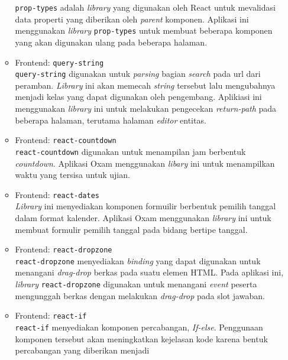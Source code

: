 \begin{itemize}
\begin{itemize}
                    \texttt{prop-types} adalah \textit{library} yang digunakan oleh React untuk mevalidasi data 
                    properti yang diberikan oleh \textit{parent} komponen. Aplikasi ini menggunakan \textit{library}
                    \texttt{prop-types} untuk membuat beberapa komponen yang akan digunakan ulang pada beberapa
                    halaman.
                \item Frontend: \texttt{query-string} \\
                    \texttt{query-string} digunakan untuk \textit{parsing} bagian \textit{search} pada url dari
                    peramban. \textit{Library} ini akan memecah \textit{string} tersebut lalu mengubahnya menjadi
                    kelas yang dapat digunakan oleh pengembang. Aplikiasi ini menggunakan \textit{library} ini untuk
                    melakukan pengecekan \textit{return-path} pada beberapa halaman, terutama halaman \textit{editor}
                    entitas.
                \item Frontend: \texttt{react-countdown} \\
                    \texttt{react-countdown} digunakan untuk menampilan jam berbentuk \textit{countdown}. 
                    Aplikasi Oxam menggunakan \textit{libary} ini untuk menampilkan waktu yang tersisa
                    untuk ujian.
                \item Frontend: \texttt{react-dates} \\
                    \textit{Library} ini menyediakan komponen formuilir berbentuk pemilih tanggal dalam 
                    format kalender. Aplikasi Oxam menggunakan \textit{library} ini untuk membuat formulir
                    pemilih tanggal pada bidang bertipe tanggal.
                \item Frontend: \texttt{react-dropzone} \\
                    \texttt{react-dropzone} menyediakan \textit{binding} yang dapat digunakan untuk menangani
                    \textit{drag-drop} berkas pada suatu elemen HTML. Pada aplikasi ini, \textit{library}
                    \texttt{react-dropzone} digunakan untuk menangani \textit{event} peserta mengunggah berkas
                    dengan melakukan \textit{drag-drop} pada slot jawaban.
                \item Frontend: \texttt{react-if} \\
                    \texttt{react-if} menyediakan komponen percabangan, \textit{If-else}. Penggunaan komponen
                    tersebut akan meningkatkan kejelasan kode karena bentuk percabangan yang diberikan menjadi

\end{itemize}
\end{itemize}
